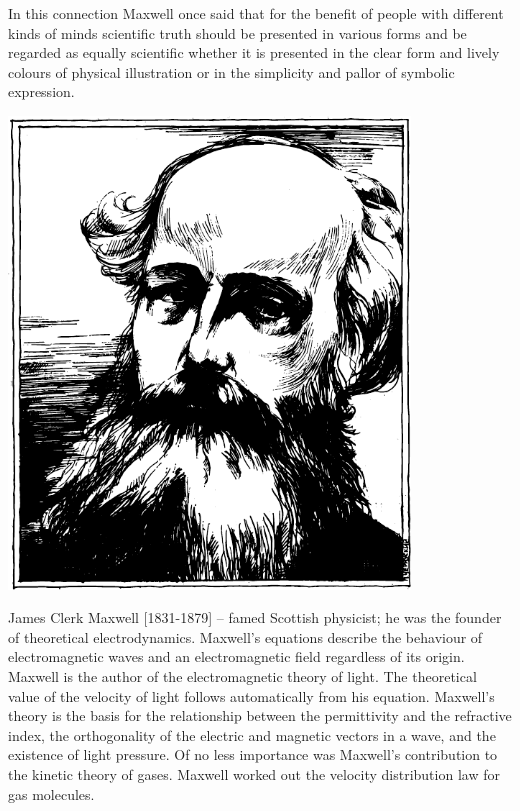 In this connection Maxwell once said that for the benefit of people with different kinds of minds scientific truth should be presented in various forms and be regarded as equally scientific whether it is presented in the clear form and lively colours of physical illustration or in the simplicity and pallor of symbolic expression.



\begin{center}
\includegraphics[width=0.8\textwidth]{figures/maxwell.pdf}
\end{center}
{\small \textsf{{James Clerk Maxwell [1831-1879]}} -- \textsf{\footnotesize famed Scottish physicist; he was the founder of theoretical electrodynamics. Maxwell's equations describe the behaviour of electromagnetic waves and an electromagnetic field regardless of its origin. Maxwell is the author of the electromagnetic theory of light. The theoretical value of the velocity of light follows automatically from his equation. Maxwell's theory is the basis for the relationship between the permittivity and the refractive index, the orthogonality of the electric and magnetic vectors in a wave, and the existence of light pressure. Of no less importance was Maxwell's contribution to the kinetic theory of gases. Maxwell worked out the velocity distribution law for gas molecules.}}



